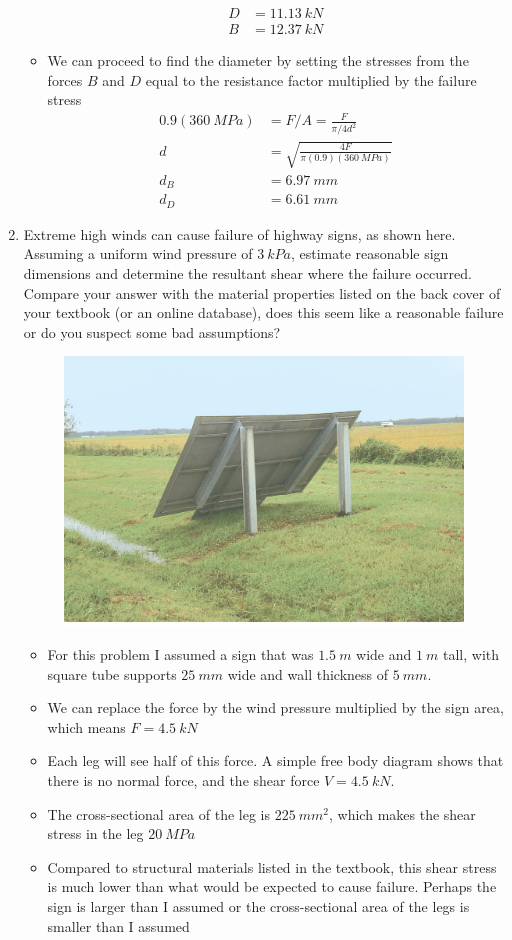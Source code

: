 \documentclass[12pt, oneside]{article}
\begin{document}
\begin{enumerate}
\begin{itemize}
\begin{align*}
			D &= \SI{11.13}{kN}\\
			B &= \SI{12.37}{kN}
		\end{align*}
	\item We can proceed to find the diameter by setting the stresses from the forces $B$ and $D$ equal to the resistance factor multiplied by the failure stress
		\begin{align*}
			0.9(\SI{360}{MPa}) &= F/A = \frac{F}{\pi/4 d^2}\\
			d &= \sqrt{\frac{4F}{\pi (0.9)(\SI{360}{MPa})}}\\
			d_B &= \SI{6.97}{mm}\\
			d_D &= \SI{6.61}{mm}
		\end{align*}
		\end{itemize}

	\item %
		Extreme high winds can cause failure of highway signs, as shown here.
		Assuming a uniform wind pressure of $\SI{3}{kPa}$, estimate reasonable sign dimensions and determine the resultant shear where the failure occurred.
		Compare your answer with the material properties listed on the back cover of your textbook (or an online database), does this seem like a reasonable failure or do you suspect some bad assumptions?
		\begin{figure}[H]
			\centering
			\includegraphics[width=0.6\linewidth]{sign}
			\label{fig:sign}
		\end{figure}
		\begin{itemize}
			\item For this problem I assumed a sign that was $\SI{1.5}{m}$ wide and $\SI{1}{m}$ tall, with square tube supports $\SI{25}{mm}$ wide and wall thickness of $\SI{5}{mm}$.
			\item We can replace the force by the wind pressure multiplied by the sign area, which means $F=\SI{4.5}{kN}$
			\item Each leg will see half of this force. A simple free body diagram shows that there is no normal force, and the shear force $V=\SI{4.5}{kN}$.
			\item The cross-sectional area of the leg is $\SI{225}{mm^2}$, which makes the shear stress in the leg $\SI{20}{MPa}$
			\item Compared to structural materials listed in the textbook, this shear stress is much lower than what would be expected to cause failure. Perhaps the sign is larger than I assumed or the cross-sectional area of the legs is smaller than I assumed
		\end{itemize}


\end{enumerate}
\end{document}
